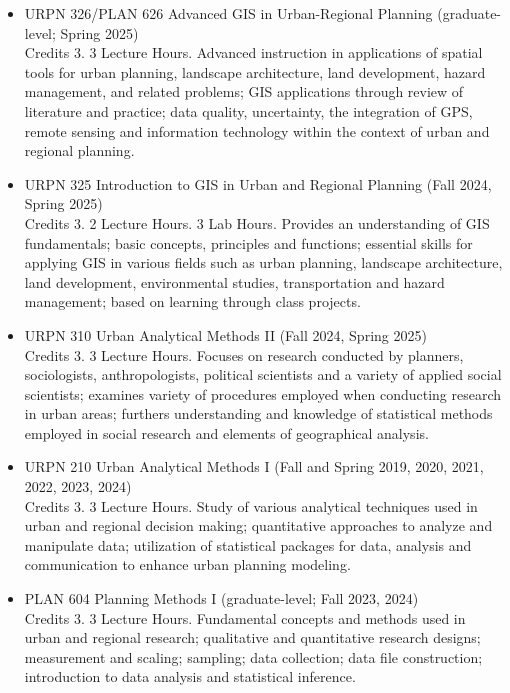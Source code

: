 \documentclass[11pt,oneside]{article}
\begin{document}
\begin{itemize}[leftmargin=40pt, label={-}]
\item {\frutigerregular URPN 326/PLAN 626 Advanced GIS in Urban-Regional Planning} (graduate-level; Spring 2025)\\
      Credits 3. 3 Lecture Hours. Advanced instruction in applications of spatial tools for urban planning, landscape architecture, land development, hazard management, and related problems; GIS applications through review of literature and practice; data quality, uncertainty, the integration of GPS, remote sensing and information technology within the context of urban and regional planning.
\item {\frutigerregular URPN 325 Introduction to GIS in Urban and Regional Planning} (Fall 2024, Spring 2025)\\
      Credits 3. 2 Lecture Hours. 3 Lab Hours. Provides an understanding of GIS fundamentals; basic concepts, principles and functions; essential skills for applying GIS in various fields such as urban planning, landscape architecture, land development, environmental studies, transportation and hazard management; based on learning through class projects.
\item {\frutigerregular URPN 310 Urban Analytical Methods II} (Fall 2024, Spring 2025)\\
      Credits 3. 3 Lecture Hours. Focuses on research conducted by planners, sociologists, anthropologists, political scientists and a variety of applied social scientists; examines variety of procedures employed when conducting research in urban areas; furthers understanding and knowledge of statistical methods employed in social research and elements of geographical analysis.
\item {\frutigerregular URPN 210 Urban Analytical Methods I} (Fall and Spring 2019, 2020, 2021, 2022, 2023, 2024)\\
      Credits 3. 3 Lecture Hours. Study of various analytical techniques used in urban and regional decision making; quantitative approaches to analyze and manipulate data; utilization of statistical packages for data, analysis and communication to enhance urban planning modeling.
\item {\frutigerregular PLAN 604 Planning Methods I} (graduate-level; Fall 2023, 2024)\\
      Credits 3. 3 Lecture Hours. Fundamental concepts and methods used in urban and regional research; qualitative and quantitative research designs; measurement and scaling; sampling; data collection; data file construction; introduction to data analysis and statistical inference.

\end{itemize}
\end{document}
